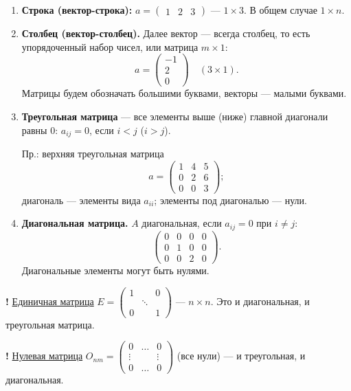 \documentclass[a4paper, 12pt]{article}
\begin{document}
\begin{enumerate}[label=\arabic*)]
  \item \textbf{Строка (вектор-строка):} $a = \begin{pmatrix} 1 & 2 & 3 \end{pmatrix}$
    --- $1 \times 3$. В общем случае $1 \times n$.
  \item \textbf{Столбец (вектор-столбец).} Далее вектор --- всегда столбец,
    то есть упорядоченный набор чисел, или матрица $m \times 1$:
    \[
      a = \begin{pmatrix} -1 \\ 2 \\ 0 \end{pmatrix} \quad (3 \times 1).
    \]
    Матрицы будем обозначать большими буквами, векторы --- малыми буквами.
  \item \textbf{Треугольная матрица} --- все элементы выше (ниже) главной
    диагонали равны 0: $a_{ij} = 0$, если $i < j$ ($i > j$).

    Пр.: верхняя треугольная матрица
    \[
      a = \begin{pmatrix} 1 & 4 & 5 \\ 0 & 2 & 6 \\ 0 & 0 & 3 \end{pmatrix};
    \]
    диагональ --- элементы вида $a_{ii}$; элементы под диагональю --- нули.
  \item \textbf{Диагональная матрица.} $A$ диагональная, если $a_{ij} = 0$
    при $i \ne j$:
    \[
      \begin{pmatrix} 0 & 0 & 0 & 0 \\ 0 & 1 & 0 & 0 \\ 0 & 0 & 2 & 0 \end{pmatrix}.
    \]
    Диагональные элементы могут быть нулями. %
\end{enumerate}

\textbf{!} \underline{Единичная матрица} $E = \begin{pmatrix} 1 & & 0 \\ & \ddots & \\ 0 & & 1 \end{pmatrix}$
--- $n \times n$. Это и диагональная, и треугольная матрица.

\textbf{!} \underline{Нулевая матрица} $O_{nm} = \begin{pmatrix} 0 & \dots & 0 \\ \vdots & & \vdots \\ 0 & \dots & 0 \end{pmatrix}$
(все нули) --- и треугольная, и диагональная.
\end{document}
